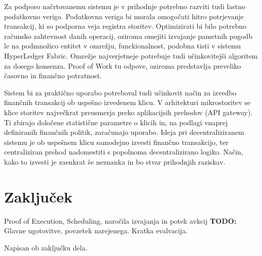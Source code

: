 \documentclass[a4paper, 12pt]{book}
\begin{document}
Za podporo načrtovanemu sistemu je v prihodnje potrebno razviti tudi lastno podatkovno verigo.
Podatkovna veriga bi morala omogočati hitro potrjevanje transakcij, ki so podporna veja registra storitev.
Optimizirati bi bilo potrebno računsko zahtevnost danih operacij, oziroma omejiti izvajanje pametnih pogodb le na podmnožico entitet v omrežju, funckionalnost, podobna tisti v sistemu HyperLedger Fabric.
Omrežje najverjetneje potrebuje tudi učinkovitejši algoritem za dosego konsenza.
Proof of Work tu odpove, oziroma predstavlja preveliko časovno in finančno potratnost.

Sistem bi za praktično uporabo potreboval tudi učinkovit način za izvedbo finančnih transakcij ob uspešno izvedenem klicu.
V arhitekturi mikrostoritev se klice storitev največkrat preusmerja preko aplikacijsih prehodov (API gateway).
Ti zbirajo določene statistične parametre o klicih in, na podlagi vnaprej definiranih finančnih politik, zaračunajo uporabo.
Ideja pri decentraliziranem sistemu je ob uspešnem klicu samodejno izvesti finančno transakcijo, ter centraliziran prehod nadomestiti s popolnoma decentralizirano logiko.
Način, kako to izvesti je zaenkrat še neznanka in bo stvar prihodnjih raziskav.


\chapter{Zaključek}
\label{stroka}

Proof of Execution, Scheduling, naročila izvajanja in potek avkcij
\textbf{TODO:} Glavne ugotovitve, povzetek narejenega. Kratka evalvacija.

Napisan ob zaključku dela.


\newpage %
\ \\
\clearpage
{}


\end{document}
